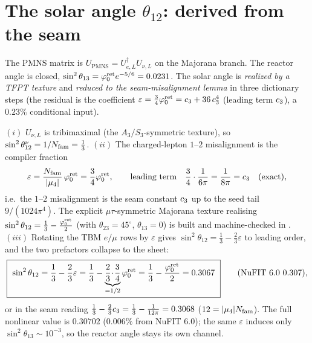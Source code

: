 \section{The solar angle $\theta_{12}$: derived from the seam}
The PMNS matrix is $U_{\mathrm{PMNS}}=U_{e,L}^\dagger U_{\nu,L}$ on the Majorana branch. The reactor angle
is closed, $\sin^2\theta_{13}=\varphi_0^{\mathrm{ret}} e^{-5/6}=0.0231$. The solar angle is \emph{realized by a TFPT texture}
and \emph{reduced to the seam-misalignment lemma} in three dictionary steps (the residual is the
coefficient $\varepsilon=\tfrac34\varphi_0^{\mathrm{ret}}=c_3+36\,c_3^4$ (leading term $c_3$), a $0.23\%$ conditional input).

\begin{proposition}
\label{prop:theta12}
$(i)$ $U_{\nu,L}$ is tribimaximal (the $A_3/S_3$-symmetric texture), so $\sin^2\theta_{12}^\nu=1/N_{\mathrm{fam}}=\tfrac13$.
$(ii)$ The charged-lepton $1$--$2$ misalignment is the compiler fraction
\[
  \varepsilon=\frac{N_{\mathrm{fam}}}{|\mu_4|}\,\varphi_0^{\mathrm{ret}}=\frac34\varphi_0^{\mathrm{ret}},\qquad\text{leading term}\quad
  \frac34\cdot\frac1{6\pi}=\frac1{8\pi}=c_3\quad(\text{exact}),
\]
i.e.\ the $1$--$2$ misalignment is the seam constant $c_3$ up to the seed tail $9/(1024\pi^4)$.
The explicit $\mu\tau$-symmetric Majorana texture realising $\sin^2\theta_{12}=\tfrac13-\tfrac{\varphi_0^{\mathrm{ret}}}2$ (with
$\theta_{23}=45^\circ$, $\theta_{13}=0$) is built and machine-checked in .
$(iii)$ Rotating the TBM $e/\mu$ rows by $\varepsilon$ gives $\sin^2\theta_{12}=\tfrac13-\tfrac23\varepsilon$
to leading order, and the two prefactors collapse to the sheet:
\[
  \boxed{\ \sin^2\theta_{12}=\frac13-\frac23\varepsilon=\frac13-\underbrace{\frac23\!\cdot\!\frac34}_{=1/2}\phiz
  =\frac13-\frac{\phiz}{2}=0.3067\ }\qquad(\text{NuFIT 6.0 }0.307),
\]
or in the seam reading $\tfrac13-\tfrac23c_3=\tfrac13-\tfrac1{12\pi}=0.3068$ ($12=|\mu_4|N_{\mathrm{fam}}$). The
full nonlinear value is $0.30702$ ($0.006\%$ from NuFIT 6.0); the same $\varepsilon$ induces only
$\sin^2\theta_{13}\sim10^{-3}$, so the reactor angle stays its own channel.
\end{proposition}


